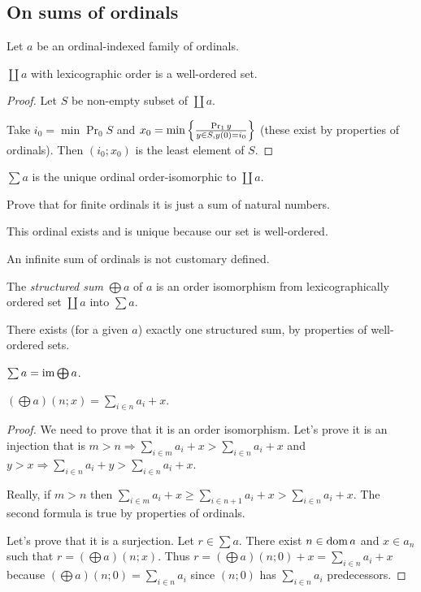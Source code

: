 \subsection{On sums of ordinals}

Let $a$ be an ordinal-indexed family of ordinals.
\begin{prop}
$\coprod a$ with lexicographic order is a well-ordered set.\end{prop}
\begin{proof}
Let $S$ be non-empty subset of $\coprod a$.

Take $i_{0}=\min\Pr_{0}S$ and $x_{0}=\min\left\{ \frac{\Pr_{1}y}{y\in S,y(0)=i_{0}}\right\}$
(these exist by properties of ordinals). Then $(i_{0};x_{0})$ is
the least element of $S$.\end{proof}
\begin{defn}
$\sum a$ is the unique ordinal order-isomorphic to $\coprod a$.\end{defn}
\begin{xca}
Prove that for finite ordinals it is just a sum of natural numbers.
\end{xca}
This ordinal exists and is unique because our set is well-ordered.
\begin{rem}
An infinite sum of ordinals is not customary defined.
\end{rem}
The \emph{structured sum} $\bigoplus a$ of
$a$ is an order isomorphism from lexicographically ordered set $\coprod a$
into $\sum a$.

There exists (for a given $a$) exactly one structured sum, by properties
of well-ordered sets.
\begin{obvious}
$\sum a=\operatorname{im}\bigoplus a$.\end{obvious}
\begin{thm}
$\left(\bigoplus a\right)(n;x)=\sum_{i\in n}a_{i}+x$.\end{thm}
\begin{proof}
We need to prove that it is an order isomorphism. Let's prove it is
an injection that is $m>n\Rightarrow\sum_{i\in m}a_{i}+x>\sum_{i\in n}a_{i}+x$
and $y>x\Rightarrow\sum_{i\in n}a_{i}+y>\sum_{i\in n}a_{i}+x$.

Really, if $m>n$ then $\sum_{i\in m}a_{i}+x\geq\sum_{i\in n+1}a_{i}+x>\sum_{i\in n}a_{i}+x$.
The second formula is true by properties of ordinals.

Let's prove that it is a surjection. Let $r\in\sum a$. There exist
$n\in\operatorname{dom} a$ and $x\in a_{n}$ such that $r=\left(\bigoplus a\right)(n;x)$.
Thus $r=\left(\bigoplus a\right)(n;0)+x=\sum_{i\in n}a_{i}+x$ because
$\left(\bigoplus a\right)(n;0)=\sum_{i\in n}a_{i}$ since $(n;0)$
has $\sum_{i\in n}a_{i}$ predecessors.
\end{proof}

